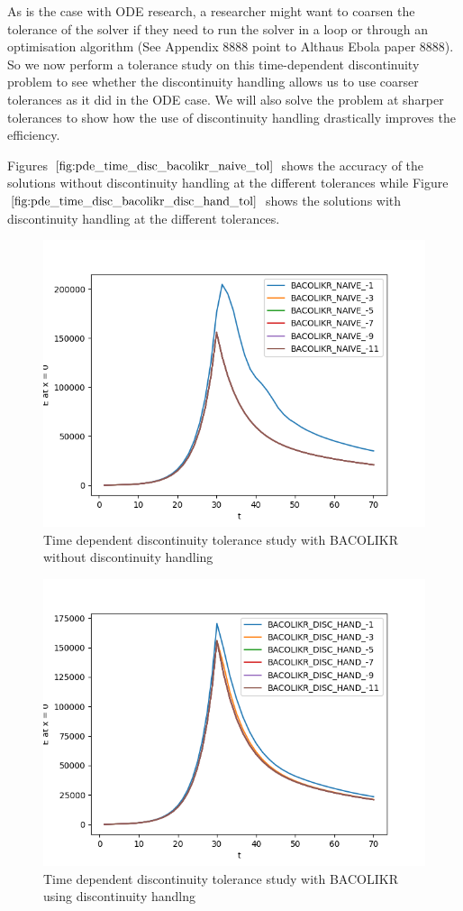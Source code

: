 \documentclass{article}
\begin{document}
As is the case with ODE research, a researcher might want to coarsen the tolerance of the solver if they need to run the solver in a loop or through an optimisation algorithm (See Appendix 8888 point to Althaus Ebola paper 8888). So we now perform a tolerance study on this time-dependent discontinuity problem to see whether the discontinuity handling allows us to use coarser tolerances as it did in the ODE case. We will also solve the problem at sharper tolerances to show how the use of discontinuity handling drastically improves the efficiency.

Figures $\ref{fig:pde_time_disc_bacolikr_naive_tol}$ shows the accuracy of the solutions without discontinuity handling at the different tolerances while Figure $\ref{fig:pde_time_disc_bacolikr_disc_hand_tol}$ shows the solutions with discontinuity handling at the different tolerances.
\begin{figure}[H]
\centering
\includegraphics[width=0.7\linewidth]{./figures/pde_time_disc_bacolikr_naive_tol}
\caption{Time dependent discontinuity tolerance study with BACOLIKR without discontinuity handling}
\label{fig:pde_time_disc_bacolikr_naive_tol}
\end{figure}

\begin{figure}[H]
\centering
\includegraphics[width=0.7\linewidth]{./figures/pde_time_disc_bacolikr_disc_hand_tol}
\caption{Time dependent discontinuity tolerance study with BACOLIKR using discontinuity handlng}
\label{fig:pde_time_disc_bacolikr_disc_hand_tol}
\end{figure}
\end{document}
